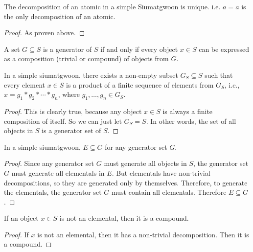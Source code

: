 \begin{lemma}[Atomics]\label{def:atomics}
    The decomposition of an atomic in a simple Siumatgwoon is unique. i.e. $a=a$ is the only decomposition of an atomic.
\end{lemma}
\begin{proof}
    As proven above.
\end{proof}



\begin{definition}[Generators]\label{def:generators}
    A set $G \subseteq S$ is a generator of $S$ if and only if every object $x \in S$ can be expressed as a composition (trivial or compound) of objects from $G$.
\end{definition}

\begin{theorem}\label{thm:generator-sets-exist-in-simple-siumatgwoons}
    In a simple siumatgwoon, there exists a non-empty subset $G_{S} \subseteq S$ such that every element $x \in S$ is a product of a finite sequence of elements from $G_S$, i.e., $x = g_1 * g_2 * \cdots * g_n$, where $g_1, \dots, g_n \in G_S$.
\end{theorem}

\begin{proof}
    This is clearly true, because any object $x\in S$ is always a finite composition of itself. So we can just let $G_S = S$. In other words, the set of all objects in $S$ is a generator set of $S$.
\end{proof}

\begin{lemma}\label{lem:elementals-are-in-every-generator-set}
    In a simple siumatgwoon, $E\subseteq G$ for any generator set $G$.
\end{lemma}
\begin{proof}
    Since any generator set $G$ must generate all objects in $S$, the generator set $G$ must generate all elementals in $E$. But elementals have non-trivial decompositions, so they are generated only by themselves. Therefore, to generate the elementals, the generator set $G$ must contain all elementals. Therefore $E\subseteq G$.
\end{proof}

\begin{lemma}\label{lem:elementals-are-not-compounds}
    If an object $x\in S$ is not an elemental, then it is a compound.
\end{lemma}
\begin{proof}
    If $x$ is not an elemental, then it has a non-trivial decomposition. Then it is a compound.
\end{proof}

